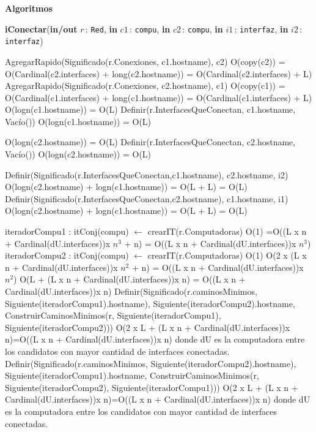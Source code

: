 \documentclass[a4paper,10pt]{article}
\let\TipoVariable=\texttt
\let\ModificadorArgumento=\textbf
\newcommand{\In}[2]{\ModificadorArgumento{in} \ensuremath{#1}\,: \TipoVariable{#2}\xspace}
\newcommand{\Inout}[2]{\ModificadorArgumento{in/out} \ensuremath{#1}\,: \TipoVariable{#2}\xspace}
\newenvironment{Algoritmos}{%
  \vspace*{2ex}%
  \noindent\textbf{\Large Algoritmos}%
  \vspace*{2ex}%
}{}
\begin{document}
\begin{Algoritmos}
\begin{algorithm}[H]{\textbf{iConectar}(\Inout {r}{Red}, \In {c1}{compu}, \In {c2}{compu}, \In {i1}{interfaz}, \In {i2}{interfaz})} 
	\begin{algorithmic}
			\State AgregarRapido(Significado(r.Conexiones, c1.hostname), c2) 		\Comment O(copy(c2)) = O(Cardinal(c2.interfaces) + long(c2.hostname)) = O(Cardinal(c2.interfaces) + L)
			\State AgregarRapido(Significado(r.Conexiones, c2.hostname), c1)		\Comment O(copy(c1)) = O(Cardinal(c1.interfaces) + long(c1.hostname)) = O(Cardinal(c1.interfaces) + L)
			 	\Comment O(logn(c1.hostname)) = O(L)
			  \State Definir(r.InterfacesQueConectan, c1.hostname, Vac\'io()) \Comment O(logn(c1.hostname)) = O(L)
			\EndIf
			
			 		\Comment O(logn(c2.hostname)) = O(L)
			  \State Definir(r.InterfacesQueConectan, c2.hostname, Vac\'io()) 	\Comment O(logn(c2.hostname)) = O(L)
			\EndIf
			
			\State Definir(Significado(r.InterfacesQueConectan,c1.hostname), c2.hostname, i2) 	\Comment O(logn(c2.hostname) + logn(c1.hostname)) = O(L + L) = O(L)
			\State Definir(Significado(r.InterfacesQueConectan,c2.hostname), c1.hostname, i1) 	\Comment O(logn(c2.hostname) + logn(c1.hostname)) = O(L + L) = O(L)
			
			
			\State iteradorCompu1 : itConj(compu) $\gets$ crearIT(r.Computadoras) 		\Comment O(1)
			 \Comment =O((L x n + Cardinal(dU.interfaces))x $n^{3}$ + n) = O((L x n + Cardinal(dU.interfaces))x $n^{3}$)
			  \State iteradorCompu2 : itConj(compu) $\gets$ crearIT(r.Computadoras) 		\Comment O(1)
			   	\Comment O(2 x (L x n + Cardinal(dU.interfaces))x $n^{2}$ + n) = O((L x n + Cardinal(dU.interfaces))x $n^{2}$)
			     \Comment O(L + (L x n + Cardinal(dU.interfaces))x n) = O((L x n + Cardinal(dU.interfaces))x n)
			      \State Definir(Significado(r.caminosMinimos, Siguiente(iteradorCompu1).hostname), Siguiente(iteradorCompu2).hostname, ConstruirCaminosMinimos(r, Siguiente(iteradorCompu1), Siguiente(iteradorCompu2))) \Comment O(2 x L + (L x n + Cardinal(dU.interfaces))x n)=O((L x n + Cardinal(dU.interfaces))x n) donde dU es la computadora entre los candidatos con mayor cantidad de interfaces conectadas.
			      \State Definir(Significado(r.caminosMinimos, Siguiente(iteradorCompu2).hostname), Siguiente(iteradorCompu1).hostname, ConstruirCaminosMinimos(r, Siguiente(iteradorCompu2), Siguiente(iteradorCompu1))) \Comment O(2 x L + (L x n + Cardinal(dU.interfaces))x n)=O((L x n + Cardinal(dU.interfaces))x n) donde dU es la computadora entre los candidatos con mayor cantidad de interfaces conectadas.
			    \EndIf
			  

\end{algorithmic}
\end{algorithm}
\end{Algoritmos}
\end{document}
